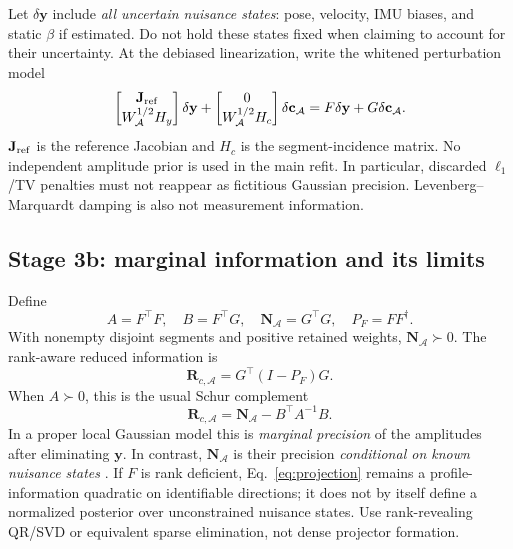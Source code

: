 \documentclass[conference]{IEEEtran}%
\newcommand{\A}{\mathcal A}
\newcommand{\N}{\mathbf N}
\newcommand{\Rc}{\mathbf R}
\begin{document}
Let $\delta\mathbf y$ include \emph{all uncertain nuisance states}: pose, velocity, IMU biases, and static $\beta$ if estimated. Do not hold these states fixed when claiming to account for their uncertainty. At the debiased linearization, write the whitened perturbation model
\begin{equation}
 \begin{bmatrix}\mathbf J_{\rm ref}\\W_\A^{1/2}H_y\end{bmatrix}\delta\mathbf y
 +\begin{bmatrix}0\\W_\A^{1/2}H_c\end{bmatrix}\delta\mathbf c_\A
 =F\delta\mathbf y+G\delta\mathbf c_\A.
 \label{eq:fg}
\end{equation}
$\mathbf J_{\rm ref}$ is the reference Jacobian and $H_c$ is the segment-incidence matrix. No independent amplitude prior is used in the main refit. In particular, discarded $\ell_1$/TV penalties must not reappear as fictitious Gaussian precision. Levenberg--Marquardt damping is also not measurement information.

\subsection{Stage 3b: marginal information and its limits}
\label{sec:information}
Define
\begin{equation}
 A=F^\top F,\quad B=F^\top G,\quad
 \N_\A=G^\top G,\quad P_F=FF^\dagger.
 \label{eq:blocks}
\end{equation}
With nonempty disjoint segments and positive retained weights, $\N_\A\succ0$. The rank-aware reduced information is
\begin{equation}
 \boxed{\Rc_{c,\A}=G^\top(I-P_F)G.}
 \label{eq:projection}
\end{equation}
When $A\succ0$, this is the usual Schur complement
\begin{equation}
 \Rc_{c,\A}=\N_\A-B^\top A^{-1}B.
 \label{eq:schur}
\end{equation}
In a proper local Gaussian model this is \emph{marginal precision} of the amplitudes after eliminating $\mathbf y$. In contrast, $\N_\A$ is their precision \emph{conditional on known nuisance states} \cite{paskin2002}. If $F$ is rank deficient, Eq.~\eqref{eq:projection} remains a profile-information quadratic on identifiable directions; it does not by itself define a normalized posterior over unconstrained nuisance states. Use rank-revealing QR/SVD or equivalent sparse elimination, not dense projector formation.
\end{document}
